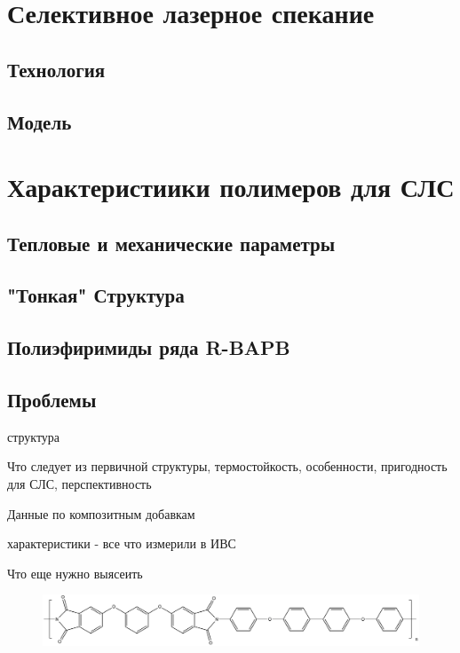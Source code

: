

\section{Селективное лазерное спекание}
\subsection{Технология}
\subsection{Модель}

\section{Характеристиики полимеров для СЛС}

\subsection{Тепловые и механические параметры}
\subsection{"Тонкая" Структура}
\subsection{Полиэфиримиды ряда R-BAPB }
\subsection{Проблемы}

структура

Что следует из первичной структуры, термостойкость, особенности, пригодность для СЛС, перспективность

Данные по композитным добавкам

характеристики - все что измерили в ИВС

Что еще нужно выясеить

		
	\begin{figure}
	\includegraphics[width=\textwidth]{fig/formula.png}
	\end{figure}



